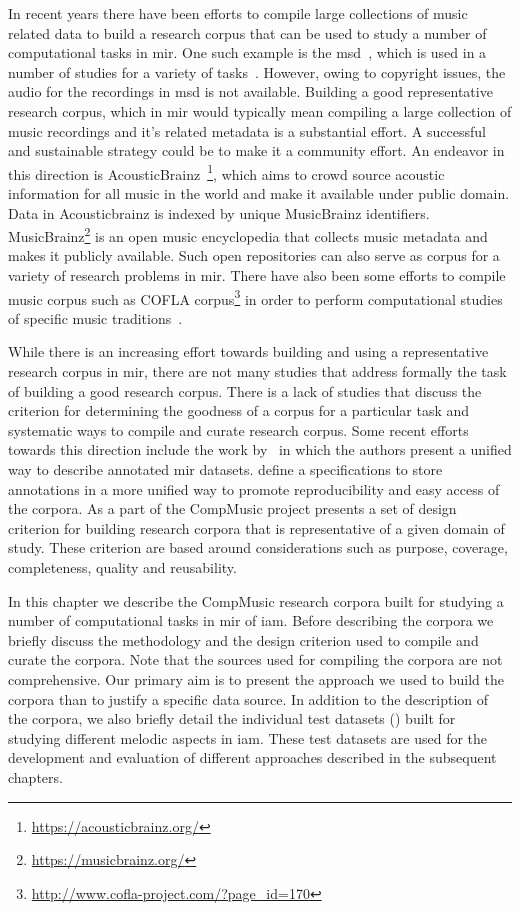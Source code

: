 In recent years there have been efforts to compile large collections of music related data to build a research corpus that can be used to study a number of computational tasks in \gls{mir}. One such example is the \gls{msd}~\citep{Bertin-Mahieux2011}, which is used in a number of studies for a variety of tasks~\citep{serra2012measuring,sturm2012survey}. However, owing to copyright issues, the audio for the recordings in \gls{msd} is not available. Building a good representative research corpus, which in \gls{mir} would typically mean compiling a large collection of music recordings and it's related metadata is a substantial effort. A successful and sustainable strategy could be to make it a community effort. An endeavor in this direction is AcousticBrainz~\citep{porter2015acousticbrainz}\footnote{\url{https://acousticbrainz.org/}}, which aims to crowd source acoustic information for all music in the world and make it available under public domain. Data in Acousticbrainz is indexed by unique MusicBrainz identifiers. MusicBrainz\footnote{\url{https://musicbrainz.org/}} is an open music encyclopedia that collects music metadata and makes it publicly available. Such open repositories can also serve as corpus for a variety of research problems in \gls{mir}. There have also been some efforts to compile music corpus such as COFLA corpus\footnote{\url{http://www.cofla-project.com/?page_id=170}} in order to perform computational studies of specific music traditions~\citep{kroher2016corpus}.

While there is an increasing effort towards building and using a representative research corpus in \gls{mir}, there are not many studies that address formally the task of building a good research corpus. There is a lack of studies that discuss the criterion for determining the goodness of a corpus for a particular task and systematic ways to compile and curate research corpus. Some recent efforts towards this direction include the work by~\cite{peeters2012towards} in which the authors present a unified way to describe annotated \Gls{mir} datasets. \cite{Humphrey:JAMS:ISMIR:14} define a specifications to store annotations in a more unified way to promote reproducibility and easy access of the corpora. As a part of the CompMusic project \cite{serra:14:corpus} presents a set of design criterion for building research corpora that is representative of a given domain of study. These criterion are based around considerations such as purpose, coverage, completeness, quality and reusability.

In this chapter we describe the CompMusic research corpora built for studying a number of computational tasks in \gls{mir} of \gls{iam}. Before describing the corpora we briefly discuss the methodology and the design criterion used to compile and curate the corpora. Note that the sources used for compiling the corpora are not comprehensive. Our primary aim is to present the approach we used to build the corpora than to justify a specific data source. In addition to the description of the corpora, we also briefly detail the individual test datasets () built for studying different melodic aspects in \gls{iam}. These test datasets are used for the development and evaluation of different approaches described in the subsequent chapters. 

